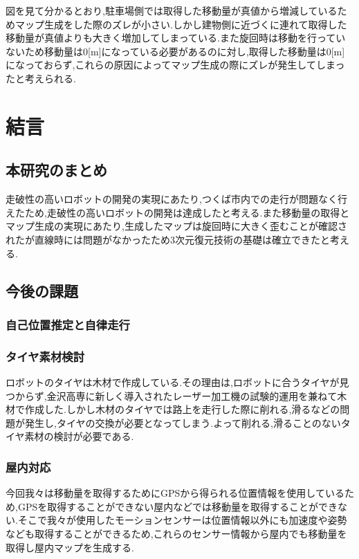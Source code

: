 \documentclass[12pt,oneside]{sotsuken_paper}
\begin{document}
図を見て分かるとおり,駐車場側では取得した移動量が真値から増減しているためマップ生成をした際のズレが小さい.しかし建物側に近づくに連れて取得した移動量が真値よりも大きく増加してしまっている.また旋回時は移動を行っていないため移動量は0[m]になっている必要があるのに対し,取得した移動量は0[m]になっておらず,これらの原因によってマップ生成の際にズレが発生してしまったと考えられる.

\chapter{結言}
\section{本研究のまとめ}
走破性の高いロボットの開発の実現にあたり,つくば市内での走行が問題なく行えたため,走破性の高いロボットの開発は達成したと考える.また移動量の取得とマップ生成の実現にあたり,生成したマップは旋回時に大きく歪むことが確認されたが直線時には問題がなかったため3次元復元技術の基礎は確立できたと考える.

\section{今後の課題}
\subsection{自己位置推定と自律走行}


\subsection{タイヤ素材検討}
ロボットのタイヤは木材で作成している.その理由は,ロボットに合うタイヤが見つからず,金沢高専に新しく導入されたレーザー加工機の試験的運用を兼ねて木材で作成した.しかし木材のタイヤでは路上を走行した際に削れる,滑るなどの問題が発生し,タイヤの交換が必要となってしまう.よって削れる,滑ることのないタイヤ素材の検討が必要である.

\subsection{屋内対応}
今回我々は移動量を取得するためにGPSから得られる位置情報を使用しているため,GPSを取得することができない屋内などでは移動量を取得することができない.そこで我々が使用したモーションセンサーは位置情報以外にも加速度や姿勢なども取得することができるため,これらのセンサー情報から屋内でも移動量を取得し屋内マップを生成する.
\end{document}
